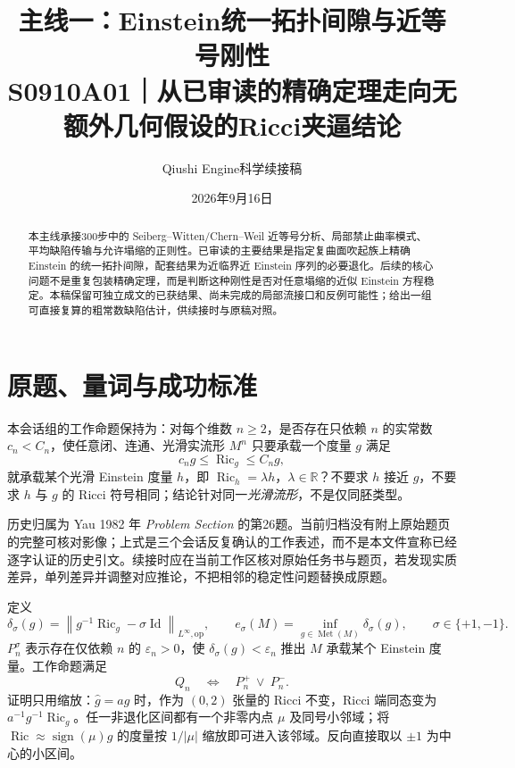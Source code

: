 \documentclass[UTF8,a4paper,11pt,fontset=fandol]{ctexart}
\title{主线一：Einstein统一拓扑间隙与近等号刚性\\[0.5em]{\large S0910A01｜从已审读的精确定理走向无额外几何假设的Ricci夹逼结论}}
\author{Qiushi Engine\quad 科学续接稿}
\date{2026年9月16日}
\numberwithin{equation}{section}
\theoremstyle{definition}
\newcommand{\Ric}{\operatorname{Ric}}
\newcommand{\Met}{\operatorname{Met}}
\newcommand{\Id}{\operatorname{Id}}
\newcommand{\op}{\mathrm{op}}
\newcommand{\R}{\mathbb R}
\newcommand{\norm}[1]{\left\lVert#1\right\rVert}
\begin{document}
\maketitle
\begin{abstract}
本主线承接300步中的 Seiberg--Witten/Chern--Weil 近等号分析、局部禁止曲率模式、平均缺陷传输与允许塌缩的正则性。已审读的主要结果是指定复曲面吹起族上精确 Einstein 的统一拓扑间隙，配套结果为近临界近 Einstein 序列的必要退化。后续的核心问题不是重复包装精确定理，而是判断这种刚性是否对任意塌缩的近似 Einstein 方程稳定。本稿保留可独立成文的已获结果、尚未完成的局部流接口和反例可能性；给出一组可直接复算的粗常数缺陷估计，供续接时与原稿对照。
\end{abstract}
\begingroup
\small\linespread{1.0}\selectfont\setlength{\parskip}{0pt}
\tableofcontents
\endgroup
\clearpage

\section{原题、量词与成功标准}
本会话组的工作命题保持为：对每个维数 $n\ge2$，是否存在只依赖 $n$ 的实常数 $c_n<C_n$，使任意闭、连通、光滑实流形 $M^n$ 只要承载一个度量 $g$ 满足
\begin{equation}\label{eq:Q}
 c_ng\le\Ric_g\le C_ng,
\end{equation}
就承载某个光滑 Einstein 度量 $h$，即 $\Ric_h=\lambda h$，$\lambda\in\R$？不要求 $h$ 接近 $g$，不要求 $h$ 与 $g$ 的 Ricci 符号相同；结论针对同一\emph{光滑流形}，不是仅同胚类型。

历史归属为 Yau 1982 年 \emph{Problem Section} 的第26题\cite{Yau1982}。当前归档没有附上原始题页的完整可核对影像；上式是三个会话反复确认的工作表述，而不是本文件宣称已经逐字认证的历史引文。续接时应在当前工作区核对原始任务书与题页，若发现实质差异，单列差异并调整对应推论，不把相邻的稳定性问题替换成原题。

定义
\begin{equation}\label{eq:defect}
 \delta_\sigma(g)=\norm{g^{-1}\Ric_g-\sigma\Id}_{L^\infty,\op},\qquad
 e_\sigma(M)=\inf_{g\in\Met(M)}\delta_\sigma(g),\qquad \sigma\in\{+1,-1\}.
\end{equation}
$P_n^\sigma$ 表示存在仅依赖 $n$ 的 $\varepsilon_n>0$，使 $\delta_\sigma(g)<\varepsilon_n$ 推出 $M$ 承载某个 Einstein 度量。工作命题满足
\begin{equation}\label{eq:branches}
 Q_n\quad\Longleftrightarrow\quad P_n^+\ \lor\ P_n^-.
\end{equation}
证明只用缩放：$\widehat g=ag$ 时，作为 $(0,2)$ 张量的 Ricci 不变，Ricci 端同态变为 $a^{-1}g^{-1}\Ric_g$。任一非退化区间都有一个非零内点 $\mu$ 及同号小邻域；将 $\Ric\approx\operatorname{sign}(\mu)g$ 的度量按 $1/|\mu|$ 缩放即可进入该邻域。反向直接取以 $\pm1$ 为中心的小区间。
\end{document}
